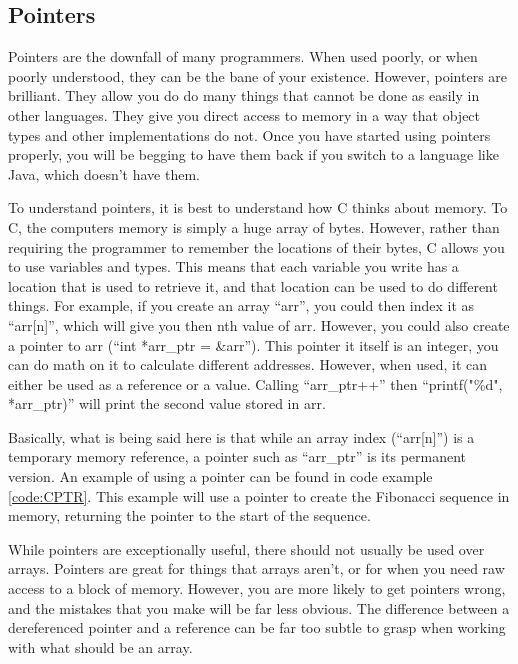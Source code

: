 \documentclass[a4paper,11pt]{report}
\begin{document}
		\subsection{Pointers}
			Pointers are the downfall of many programmers. 
			When used poorly, or when poorly understood, they can be the bane of your existence. 
			However, pointers are brilliant. 
			They allow you do do many things that cannot be done as easily in other languages. 
			They give you direct access to memory in a way that object types and other implementations do not. 
			Once you have started using pointers properly, you will be begging to have them back if you switch to a language like Java, which doesn't have them. 

			To understand pointers, it is best to understand how C thinks about memory. 
			To C, the computers memory is simply a huge array of bytes. 
			However, rather than requiring the programmer to remember the locations of their bytes, C allows you to use variables and types. 
			This means that each variable you write has a location that is used to retrieve it, and that location can be used to do different things. 
			For example, if you create an array ``arr'', you could then index it as ``arr[n]'', which will give you then nth value of arr. 
			However, you could also create a pointer to arr (``int *arr\_ptr = \&arr''). 
			This pointer it itself is an integer, you can do math on it to calculate different addresses. 
			However, when used, it can either be used as a reference or a value. 
			Calling ``arr\_ptr++'' then ``printf("\%d", *arr\_ptr)'' will print the second value stored in arr. 

			Basically, what is being said here is that while an array index (``arr[n]'') is a temporary memory reference, a pointer such as ``arr\_ptr'' is its permanent version. 
			An example of using a pointer can be found in code example \ref{code:CPTR}. 
			This example will use a pointer to create the Fibonacci sequence in memory, returning the pointer to the start of the sequence. 
			\begin{code}
				C}]{./CPointers.c}
				\caption{Example of a C Pointers}
				\label{code:CPTR}
			\end{code}

			While pointers are exceptionally useful, there should not usually be used over arrays. 
			Pointers are great for things that arrays aren't, or for when you need raw access to a block of memory. 
			However, you are more likely to get pointers wrong, and the mistakes that you make will be far less obvious. 
			The difference between a dereferenced pointer and a reference can be far too subtle to grasp when working with what should be an array. 
\end{document}
